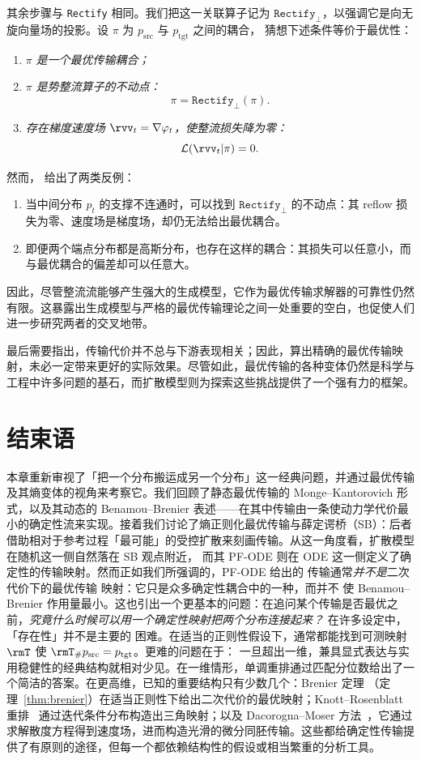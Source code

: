 其余步骤与 \texttt{Rectify} 相同。我们把这一关联算子记为 $\texttt{Rectify}_{\perp}$，以强调它是向无旋向量场的投影。设 $\pi$ 为 $p_{\mathrm{src}}$ 与 $p_{\mathrm{tgt}}$ 之间的耦合，\citet{liu2022flow} 猜想下述条件等价于最优性：
\begin{enumerate}[label=(\textit{\roman*})]
  \item $\pi$ \textit{是一个最优传输耦合；}
  \item $\pi$ \textit{是势整流算子的不动点：}
  \[
    \pi = \texttt{Rectify}_{\perp}(\pi).
  \]
  \item \textit{存在梯度速度场 $\rvv_t = \nabla \varphi_t$，使整流损失降为零：}
  \[
    \mathcal{L}(\rvv_t |\pi) = 0.
  \]
\end{enumerate}
然而，\citet{hertrich2025relation} 给出了两类反例：
\begin{enumerate}
  \item 当中间分布 $p_t$ 的支撑不连通时，可以找到 $\texttt{Rectify}_{\perp}$ 的不动点：其 reflow 损失为零、速度场是梯度场，却仍无法给出最优耦合。
  \item 即便两个端点分布都是高斯分布，也存在这样的耦合：其损失可以任意小，而与最优耦合的偏差却可以任意大。
\end{enumerate}

因此，尽管整流流能够产生强大的生成模型，它作为最优传输求解器的可靠性仍然有限。这暴露出生成模型与严格的最优传输理论之间一处重要的空白，也促使人们进一步研究两者的交叉地带。

最后需要指出，传输代价并不总与下游表现相关；因此，算出精确的最优传输映射，未必一定带来更好的实际效果。尽管如此，最优传输的各种变体仍然是科学与工程中许多问题的基石，而扩散模型则为探索这些挑战提供了一个强有力的框架。

\section{结束语}
本章重新审视了「把一个分布搬运成另一个分布」这一经典问题，并通过最优传输及其熵变体的视角来考察它。我们回顾了静态最优传输的
Monge--Kantorovich 形式，以及其动态的 Benamou--Brenier 表述——在其中传输由一条使动力学代价最小的确定性流来实现。接着我们讨论了熵正则化最优传输与薛定谔桥（SB）：后者借助相对于参考过程「最可能」的受控扩散来刻画传输。从这一角度看，扩散模型在随机这一侧自然落在 SB 观点附近，
而其 PF-ODE 则在 ODE 这一侧定义了确定性的传输映射。然而正如我们所强调的，PF-ODE 给出的
传输通常\emph{并不是}二次代价下的最优传输
映射：它只是众多确定性耦合中的一种，而并不
使 Benamou--Brenier 作用量最小。这也引出一个更基本的问题：在追问某个传输是否最优之前，\emph{究竟什么时候可以用一个确定性映射把两个分布连接起来？} 在许多设定中，「存在性」并不是主要的
困难。在适当的正则性假设下，通常都能找到可测映射 $\rmT$ 使
$\rmT_\# p_{\mathrm{src}} = p_{\mathrm{tgt}}$。更难的问题在于：
一旦超出一维，兼具显式表达与实用稳健性的经典结构就相对少见。在一维情形，单调重排通过匹配分位数给出了一个简洁的答案。在更高维，已知的重要结构只有少数几个：Brenier 定理
（定理~\ref{thm:brenier}）在适当正则性下给出二次代价的最优映射；Knott--Rosenblatt
重排~\citep{rosenblatt1952remarks,knothe1957contributions}
通过迭代条件分布构造出三角映射；以及
Dacorogna--Moser 方法~\citep{dacorogna1990partial}，它通过求解散度方程得到速度场，进而构造光滑的微分同胚传输。这些都给确定性传输提供了有原则的途径，但每一个都依赖结构性的假设或相当繁重的分析工具。

